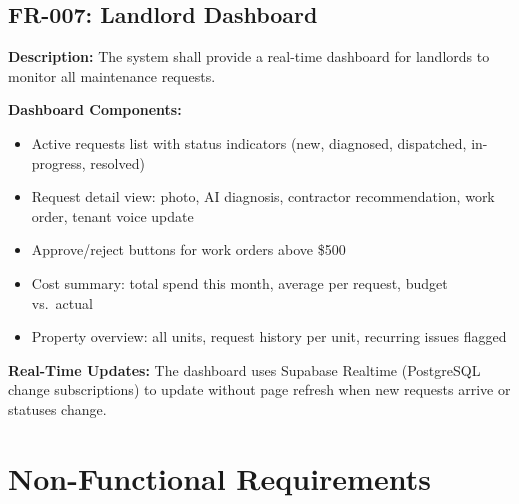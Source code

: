 \documentclass[12pt,a4paper]{article}
\begin{document}
\subsection{FR-007: Landlord Dashboard}

\textbf{Description:} The system shall provide a real-time dashboard for landlords to monitor all maintenance requests.

\textbf{Dashboard Components:}

\begin{itemize}
    \item Active requests list with status indicators (new, diagnosed, dispatched, in-progress, resolved)
    \item Request detail view: photo, AI diagnosis, contractor recommendation, work order, tenant voice update
    \item Approve/reject buttons for work orders above \$500
    \item Cost summary: total spend this month, average per request, budget vs.\ actual
    \item Property overview: all units, request history per unit, recurring issues flagged
\end{itemize}

\textbf{Real-Time Updates:} The dashboard uses Supabase Realtime (PostgreSQL change subscriptions) to update without page refresh when new requests arrive or statuses change.

\section{Non-Functional Requirements}
\end{document}
